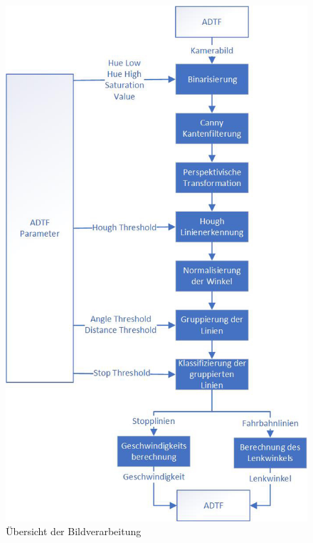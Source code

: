 \documentclass[a4paper,12pt]{report}
\begin{document}
	\begin{figure}[ht]
		\centering
		\includegraphics[width=.6\textwidth,keepaspectratio]{assets/bvaFlowchart.jpg}
		\caption{Übersicht der Bildverarbeitung}
		\label{img-bvaFlowchart}
	\end{figure}

\pagebreak
\end{document}
